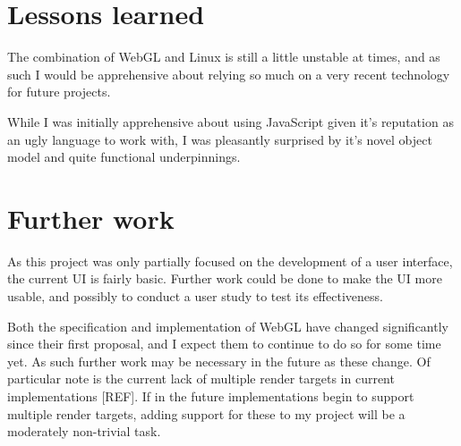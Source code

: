 \documentclass[12pt,twoside,notitlepage]{report}
\begin{document}
\section{Lessons learned}
The combination of WebGL and Linux is still a little unstable at times, and as such I would be apprehensive about relying so much on a very recent technology for future projects.

While I was initially apprehensive about using JavaScript given it's reputation as an ugly language to work with, I was pleasantly surprised by it's novel object model and quite functional underpinnings.

\section{Further work}
As this project was only partially focused on the development of a user interface, the current UI is fairly basic. Further work could be done to make the UI more usable, and possibly to conduct a user study to test its effectiveness.

Both the specification and implementation of WebGL have changed significantly since their first proposal, and I expect them to continue to do so for some time yet. As such further work may be necessary in the future as these change. Of particular note is the current lack of multiple render targets in current implementations [REF]. If in the future implementations begin to support multiple render targets, adding support for these to my project will be a moderately non-trivial task.

\cleardoublepage



\cleardoublepage

\appendix



\end{document}
